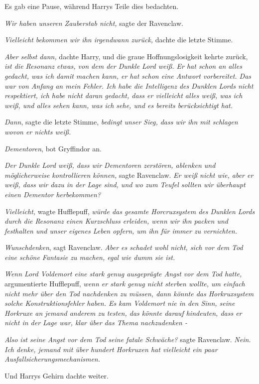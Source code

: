 {Es gab eine Pause, während Harrys Teile dies bedachten.

\emph{Wir haben unseren Zauberstab nicht,} sagte der Ravenclaw.

\emph{Vielleicht bekommen wir ihn irgendwann zurück,} dachte die letzte Stimme.

\emph{Aber selbst dann,} dachte Harry, und die graue Hoffnungslosigkeit kehrte zurück, \emph{ist die Resonanz etwas, von dem der Dunkle Lord weiß. Er hat schon an alles gedacht, was ich damit machen kann, er hat schon eine Antwort vorbereitet. Das war von Anfang an mein Fehler. Ich habe die Intelligenz des Dunklen Lords nicht respektiert, ich habe nicht daran gedacht, dass er vielleicht alles weiß, was ich weiß, und alles sehen kann, was ich sehe, und es bereits berücksichtigt hat.}

\emph{Dann}, sagte die letzte Stimme, \emph{bedingt unser Sieg, dass wir ihn mit schlagen wovon er nichts weiß.}

\emph{Dementoren}, bot Gryffindor an.

\emph{Der Dunkle Lord weiß, dass wir Dementoren zerstören, ablenken und möglicherweise kontrollieren können,} sagte Ravenclaw. \emph{Er weiß nicht wie, aber er weiß, dass wir dazu in der Lage sind, und wo zum Teufel sollten wir überhaupt einen Dementor herbekommen?}

\emph{Vielleicht,} wagte Hufflepuff, \emph{würde das gesamte Horcruxsystem des Dunklen Lords durch die Resonanz einen Kurzschluss erleiden, wenn wir ihn packen und festhalten und unser eigenes Leben opfern, um ihn für immer zu vernichten.}

\emph{Wunschdenken}, sagt Ravenclaw. \emph{Aber es schadet wohl nicht, sich vor dem Tod eine schöne Fantasie zu machen, egal wie dumm sie ist.}

\emph{\hfill\break Wenn Lord Voldemort eine stark genug ausgeprägte Angst vor dem Tod hatte,} argumentierte Hufflepuff, \emph{wenn er stark genug nicht sterben wollte, um einfach nicht mehr über den Tod nachdenken zu müssen, dann könnte das Horkruxsystem solche Konstruktionsfehler haben. Es kam Voldemort nie in den Sinn, seine Horkruxe an jemand anderem zu testen, das könnte darauf hindeuten, dass er nicht in der Lage war, klar über das Thema nachzudenken -}

\emph{Also ist seine Angst vor dem Tod seine fatale Schwäche?} sagte Ravenclaw. \emph{Nein. Ich denke, jemand mit über hundert Horkruxen hat vielleicht ein paar Ausfallsicherungsmechanismen.}

Und Harrys Gehirn dachte weiter.

}
